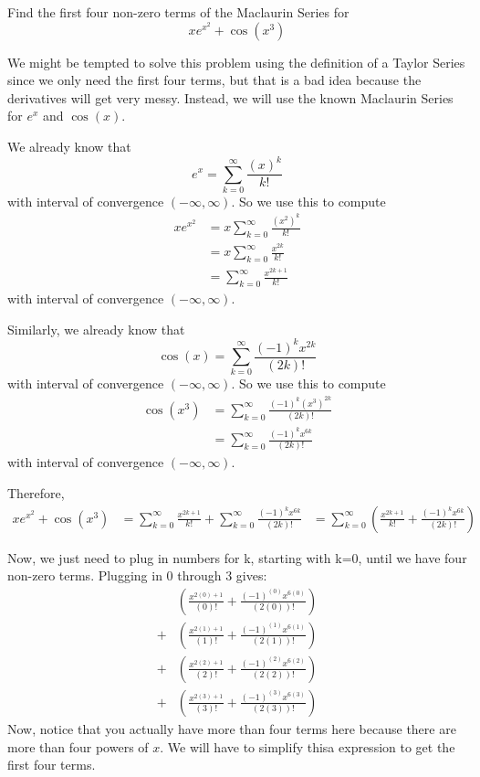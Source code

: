 \documentclass[handout]{ximera}
\begin{document}
\begin{problem}
Find the first four non-zero terms of the Maclaurin Series for 
\[
 xe^{x^2}+\cos(x^3)
\]

\begin {freeResponse}
We might be tempted to solve this problem using the definition of a Taylor Series since we only need the first four terms, but that is a bad idea because the derivatives will get very messy.  Instead, we will use the known Maclaurin Series for $e^x$ and $\cos(x)$.

We already know that 
		\[
		e^x = \sum_{k=0}^\infty \frac{(x)^k}{k!}
		\]
	with interval of convergence $( - \infty, \infty)$.  
	So we use this to compute
		\begin{align*}
		x e^{x^2} &= x \sum_{k=0}^\infty \frac{(x^2)^k}{k!}  \\
		&= x \sum_{k=0}^\infty \frac{x^{2k}}{k!}  \\
		&= \sum_{k=0}^\infty \frac{x^{2k+1}}{k!}
		\end{align*}
	with interval of convergence $( - \infty, \infty)$.  
	
Similarly, we already know that 
		\[
		\cos(x) = \sum_{k=0}^\infty \frac{(-1)^k x^{2k}}{(2k)!}
		\]
	with interval of convergence $( - \infty, \infty)$.  
	So we use this to compute
		\begin{align*}
		\cos(x^3) &=  \sum_{k=0}^\infty \frac{(-1)^k (x^3)^{2k}}{(2k)!}  \\
		&= \sum_{k=0}^\infty \frac{(-1)^k x^{6k}}{(2k)!}
		\end{align*}
	with interval of convergence $( - \infty, \infty)$.  
	
	Therefore, 
	\begin{align*}
	 xe^{x^2}+\cos(x^3) &= \sum_{k=0}^\infty \frac{x^{2k+1}}{k!} + \sum_{k=0}^\infty \frac{(-1)^k x^{6k}}{(2k)!}
	 &= \sum_{k=0}^\infty \left(\frac{x^{2k+1}}{k!} + \frac{(-1)^k x^{6k}}{(2k)!}\right)
	 \end{align*}

Now, we just need to plug in numbers for k, starting with k=0, until we have four non-zero terms. Plugging in 0 through 3 gives:\\
\begin{align*}
&\left(\frac{x^{2(0)+1}}{(0)!} + \frac{(-1)^{(0)} x^{6(0)}}{(2(0))!}\right)\\ 
+ &\left(\frac{x^{2(1)+1}}{(1)!} + \frac{(-1)^{(1)} x^{6(1)}}{(2(1))!}\right)\\
+ &\left(\frac{x^{2(2)+1}}{(2)!} + \frac{(-1)^{(2)} x^{6(2)}}{(2(2))!}\right) \\
+ &\left(\frac{x^{2(3)+1}}{(3)!} + \frac{(-1)^{(3)} x^{6(3)}}{(2(3))!}\right)
\end{align*}
Now, notice that you actually have more than four terms here because there are more than four powers of $x$.  We will have to simplify thisa expression to get the first four terms.


\end{freeResponse}
\end{problem}
\end{document}
